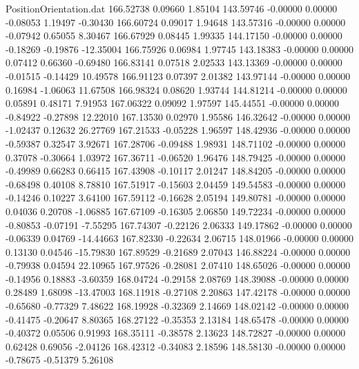 \begin{filecontents}{PositionOrientation.dat}
 166.52738    0.09660    1.85104   143.59746   -0.00000    0.00000   -0.08053    1.19497   -0.30430
 166.60724    0.09017    1.94648   143.57316   -0.00000    0.00000   -0.07942    0.65055    8.30467
 166.67929    0.08445    1.99335   144.17150   -0.00000    0.00000   -0.18269   -0.19876  -12.35004
 166.75926    0.06984    1.97745   143.18383   -0.00000    0.00000    0.07412    0.66360   -0.69480
 166.83141    0.07518    2.02533   143.13369   -0.00000    0.00000   -0.01515   -0.14429   10.49578
 166.91123    0.07397    2.01382   143.97144   -0.00000    0.00000    0.16984   -1.06063   11.67508
 166.98324    0.08620    1.93744   144.81214   -0.00000    0.00000    0.05891    0.48171    7.91953
 167.06322    0.09092    1.97597   145.44551   -0.00000    0.00000   -0.84922   -0.27898   12.22010
 167.13530    0.02970    1.95586   146.32642   -0.00000    0.00000   -1.02437    0.12632   26.27769
 167.21533   -0.05228    1.96597   148.42936   -0.00000    0.00000   -0.59387    0.32547    3.92671
 167.28706   -0.09488    1.98931   148.71102   -0.00000    0.00000    0.37078   -0.30664    1.03972
 167.36711   -0.06520    1.96476   148.79425   -0.00000    0.00000   -0.49989    0.66283    0.66415
 167.43908   -0.10117    2.01247   148.84205   -0.00000    0.00000   -0.68498    0.40108    8.78810
 167.51917   -0.15603    2.04459   149.54583   -0.00000    0.00000   -0.14246    0.10227    3.64100
 167.59112   -0.16628    2.05194   149.80781   -0.00000    0.00000    0.04036    0.20708   -1.06885
 167.67109   -0.16305    2.06850   149.72234   -0.00000    0.00000   -0.80853   -0.07191   -7.55295
 167.74307   -0.22126    2.06333   149.17862   -0.00000    0.00000   -0.06339    0.04769  -14.44663
 167.82330   -0.22634    2.06715   148.01966   -0.00000    0.00000    0.13130    0.04546  -15.79830
 167.89529   -0.21689    2.07043   146.88224   -0.00000    0.00000   -0.79938    0.04594   22.10965
 167.97526   -0.28081    2.07410   148.65026   -0.00000    0.00000   -0.14956    0.18883   -3.60359
 168.04724   -0.29158    2.08769   148.39088   -0.00000    0.00000    0.28489    1.68098  -13.47003
 168.11918   -0.27108    2.20863   147.42178   -0.00000    0.00000   -0.65680   -0.77329    7.48622
 168.19928   -0.32369    2.14669   148.02142   -0.00000    0.00000   -0.41475   -0.20647    8.80365
 168.27122   -0.35353    2.13184   148.65478   -0.00000    0.00000   -0.40372    0.05506    0.91993
 168.35111   -0.38578    2.13623   148.72827   -0.00000    0.00000    0.62428    0.69056   -2.04126
 168.42312   -0.34083    2.18596   148.58130   -0.00000    0.00000   -0.78675   -0.51379    5.26108

\end{filecontents}

